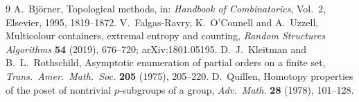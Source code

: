 \documentclass[11pt]{article}
\theoremstyle{definition}
\theoremstyle{remark}
\begin{document}
\begin{thebibliography}{9}
 A.~Bj\"orner, Topological methods, in: \emph{Handbook of Combinatorics},
  Vol.~2, Elsevier, 1995, 1819--1872.
 V.~Falgas-Ravry, K.~O'Connell and A.~Uzzell, Multicolour containers, extremal
  entropy and counting, \emph{Random Structures Algorithms} \textbf{54} (2019), 676--720;
  arXiv:1801.05195.
 D.~J.~Kleitman and B.~L.~Rothschild, Asymptotic enumeration of partial
  orders on a finite set, \emph{Trans.\ Amer.\ Math.\ Soc.} \textbf{205} (1975), 205--220.
 D.~Quillen, Homotopy properties of the poset of nontrivial $p$-subgroups of a
  group, \emph{Adv.\ Math.} \textbf{28} (1978), 101--128.
\end{thebibliography}
\end{document}
